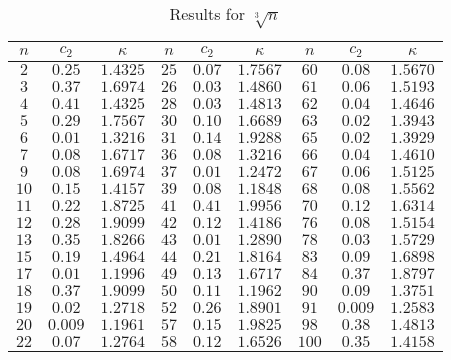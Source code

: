 \documentclass{jT}
\theoremstyle{definition}
\begin{document}
\begin{table}[ht]
\begin{center}
\begin{tabular}{||ccc|ccc|ccc||} \hline 
$n$   &  $c_{2}$  &  $\kappa$  & $n$   &  $c_{2}$  &  $\kappa$  & $n$   &  $c_{2}$  &  $\kappa$  \\ \hline
$2$   &  $0.25$   &  $1.4325$  & $25$  &  $0.07$   &  $1.7567$  & $60$  &  $0.08$   &  $1.5670$  \\ \hline
$3$   &  $0.37$   &  $1.6974$  & $26$  &  $0.03$   &  $1.4860$  & $61$  &  $0.06$   &  $1.5193$  \\ \hline
$4$   &  $0.41$   &  $1.4325$  & $28$  &  $0.03$   &  $1.4813$  & $62$  &  $0.04$   &  $1.4646$  \\ \hline
$5$   &  $0.29$   &  $1.7567$  & $30$  &  $0.10$   &  $1.6689$  & $63$  &  $0.02$   &  $1.3943$  \\ \hline
$6$   &  $0.01$   &  $1.3216$  & $31$  &  $0.14$   &  $1.9288$  & $65$  &  $0.02$   &  $1.3929$  \\ \hline
$7$   &  $0.08$   &  $1.6717$  & $36$  &  $0.08$   &  $1.3216$  & $66$  &  $0.04$   &  $1.4610$  \\ \hline
$9$   &  $0.08$   &  $1.6974$  & $37$  &  $0.01$   &  $1.2472$  & $67$  &  $0.06$   &  $1.5125$  \\ \hline
$10$  &  $0.15$   &  $1.4157$  & $39$  &  $0.08$   &  $1.1848$  & $68$  &  $0.08$   &  $1.5562$  \\ \hline
$11$  &  $0.22$   &  $1.8725$  & $41$  &  $0.41$   &  $1.9956$  & $70$  &  $0.12$   &  $1.6314$  \\ \hline
$12$  &  $0.28$   &  $1.9099$  & $42$  &  $0.12$   &  $1.4186$  & $76$  &  $0.08$   &  $1.5154$  \\ \hline
$13$  &  $0.35$   &  $1.8266$  & $43$  &  $0.01$   &  $1.2890$  & $78$  &  $0.03$   &  $1.5729$  \\ \hline
$15$  &  $0.19$   &  $1.4964$  & $44$  &  $0.21$   &  $1.8164$  & $83$  &  $0.09$   &  $1.6898$  \\ \hline
$17$  &  $0.01$   &  $1.1996$  & $49$  &  $0.13$   &  $1.6717$  & $84$  &  $0.37$   &  $1.8797$  \\ \hline
$18$  &  $0.37$   &  $1.9099$  & $50$  &  $0.11$   &  $1.1962$  & $90$  &  $0.09$   &  $1.3751$  \\ \hline
$19$  &  $0.02$   &  $1.2718$  & $52$  &  $0.26$   &  $1.8901$  & $91$  &  $0.009$  &  $1.2583$  \\ \hline
$20$  &  $0.009$  &  $1.1961$  & $57$  &  $0.15$   &  $1.9825$  & $98$  &  $0.38$   &  $1.4813$  \\ \hline
$22$  &  $0.07$   &  $1.2764$  & $58$  &  $0.12$   &  $1.6526$  & $100$ &  $0.35$   &  $1.4158$  \\ \hline
\end{tabular}                                                             
\caption{Results for $\sqrt[3]{n}$}
\end{center}
\end{table}
\end{document}

